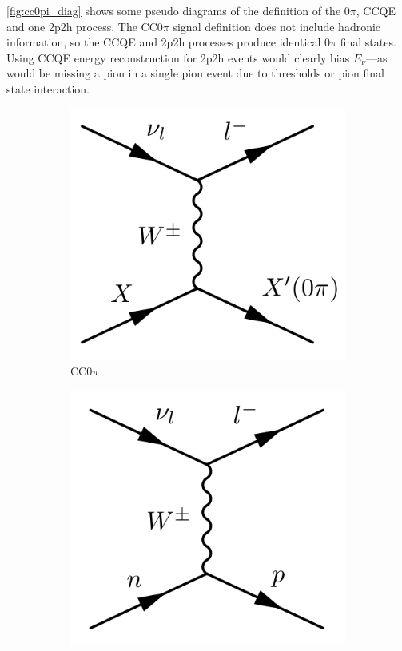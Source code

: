 \autoref{fig:cc0pi_diag} shows some pseudo diagrams of the definition of the 0$\pi$, CCQE and one 2p2h process. The CC0$\pi$ signal definition does not include hadronic information, so the CCQE and 2p2h processes produce identical 0$\pi$ final states. Using CCQE energy reconstruction for 2p2h events would clearly bias $E_\nu$---as would be missing a pion in a single pion event due to thresholds or pion final state interaction.
\begin{figure}[h]
	\centering
	\begin{subfigure}[t]{0.32\textwidth}
		\includegraphics[width=\textwidth, trim={0mm 0mm 0mm 0mm}, clip,page=1]{figures/niwg/diagrams/CC0pi}
		\caption{CC0$\pi$}
	\end{subfigure}
	\begin{subfigure}[t]{0.32\textwidth}
		\includegraphics[width=\textwidth, trim={0mm 0mm 0mm 0mm}, clip,page=1]{figures/niwg/diagrams/CCQE}

\end{subfigure}
\end{figure}
